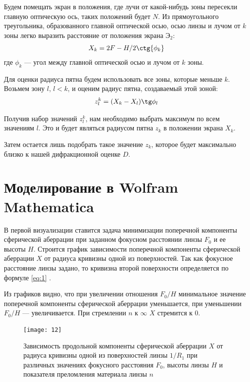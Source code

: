 \documentclass[a4paper, 12pt]{article}
\begin{document}
Будем помещать экран в положения, где лучи от какой-нибудь зоны
пересекли главную оптическую ось, таких положений будет $N$. Из
прямоугольного треугольника, образованного главной оптической осью,
осью линзы и лучом от $k$ зоны легко выразить расстояние от положения
экрана $\text{Э}_2$:
\begin{equation}
    X_k = 2F-H/2 \ctg{\phi_k}
    \label{eq:12}
\end{equation}
где $\phi_k$ --- угол между главной оптической осью и лучом от
$k$ зоны. 

Для оценки радиуса пятна будем использовать все зоны, которые меньше
$k$. Возьмем зону $l$, $l<k$, и оценим радиус пятна, создаваемый этой
зоной:
\begin{equation}
    z_l^k = (X_k-X_{l})\tg \phi_{l}
    \label{eq:13}
\end{equation}

Получив набор значений $z_l^k$, нам необходимо выбрать максимум по всем
значениям $l$. Это и будет являться радиусом пятна $z_k$ в положении экрана
$X_k$.

Затем остается лишь подобрать такое значение $z_k$, которое будет
максимально близко к нашей дифракционной оценке $D$. 

\section{Моделирование в Wolfram Mathematica}
В первой визуализации ставится задача минимизации
поперечной компоненты сферической аберрации при заданном фокусном
расстоянии линзы $F_0$ и ее высоты $H$. Строится график зависимости
поперечной компоненты
сферической аберрации $X$ от радиуса кривизны одной из поверхностей. Так
как фокусное расстояние линзы задано, то кривизна второй поверхности
определяется по формуле \eqref{eq:1} .

Из графиков видно, что при увеличении отношения $F_0/H$ минимальное
значение поперечной компоненты сферической аберрации уменьшается, при
уменьшении $F_0/H$ --- увеличивается. При стремлении $n$ к $\infty$
$X$ стремится к $0$.



\begin{figure}[H]
    \texttt{[image: 12]} 
    \caption{Зависимость продольной компоненты сферической аберрации
    $X$ от радиуса кривизны одной из поверхностей линзы $1/R_1$ при
различных значениях фокусного расстояния $F_0$, высоты линзы $H$ и
показателя преломления материала линзы $n$}
\label{fig:4}
\end{figure}
\end{document}
